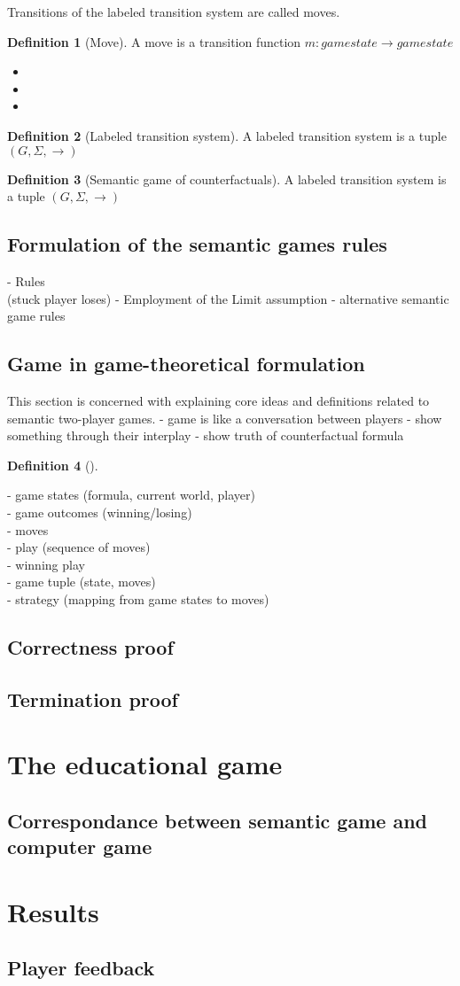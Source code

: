 \documentclass[a4paper,american]{paper}
\theoremstyle{definition}\newtheorem{definition}{Definition}
\begin{document}
\noindent Transitions of the labeled transition system are called moves.
\begin{definition}[Move]
A move is a transition function $m: game state \rightarrow game state$
\begin{itemize}
	\item[(1)]
	\item[(2)]
	\item[(3)]
\end{itemize}
\end{definition}
\begin{definition}[Labeled transition system]
A labeled transition system is a tuple $(G,\Sigma ,\rightarrow )$
\end{definition}
\begin{definition}[Semantic game of counterfactuals]
A labeled transition system is a tuple $(G,\Sigma ,\rightarrow )$
\end{definition}
\subsection{Formulation of the semantic games rules}
- Rules\\ (stuck player loses)
- Employment of the Limit assumption
- alternative semantic game rules
\subsection{Game in game-theoretical formulation}
This section is concerned with explaining core ideas and definitions related to semantic two-player games.
- game is like a conversation between players
- show something through their interplay
- show truth of counterfactual formula
\begin{definition}[]

\end{definition}
- game states (formula, current world, player)\\
- game outcomes (winning/losing)\\
- moves\\
- play (sequence of moves)\\
- winning play\\
- game tuple (state, moves)\\
- strategy (mapping from game states to moves)\\
\subsection{Correctness proof}
\subsection{Termination proof}

\section{The educational game}
\subsection{Correspondance between semantic game and computer game}
\section{Results}
\subsection{Player feedback}

\nocite{*}

\end{document}
